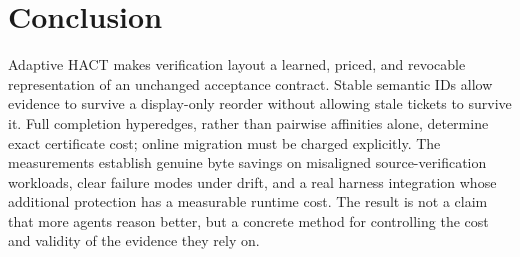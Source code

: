 \section{Conclusion}
Adaptive HACT makes verification layout a learned, priced, and revocable representation of an unchanged acceptance contract. Stable semantic IDs allow evidence to survive a display-only reorder without allowing stale tickets to survive it. Full completion hyperedges, rather than pairwise affinities alone, determine exact certificate cost; online migration must be charged explicitly. The measurements establish genuine byte savings on misaligned source-verification workloads, clear failure modes under drift, and a real harness integration whose additional protection has a measurable runtime cost. The result is not a claim that more agents reason better, but a concrete method for controlling the cost and validity of the evidence they rely on.
